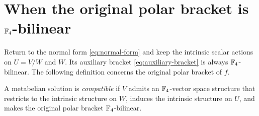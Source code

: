 \section{When the original polar bracket is \texorpdfstring{\(\mathbb F_4\)}{F4}-bilinear}
\label{sec:compatible}

Return to the normal form \eqref{eq:normal-form} and keep the intrinsic
scalar actions on \(U=V/W\) and \(W\). Its auxiliary bracket
\eqref{eq:auxiliary-bracket} is always \(\mathbb F_4\)-bilinear.
The following definition concerns the original polar bracket of \(f\).

\begin{definition}\label{def:compatible}
A metabelian solution is \emph{compatible} if \(V\) admits an
\(\mathbb F_4\)-vector space structure that restricts to the intrinsic structure
on \(W\), induces the intrinsic structure on \(U\), and makes the
original polar bracket \(\mathbb F_4\)-bilinear.
\end{definition}

